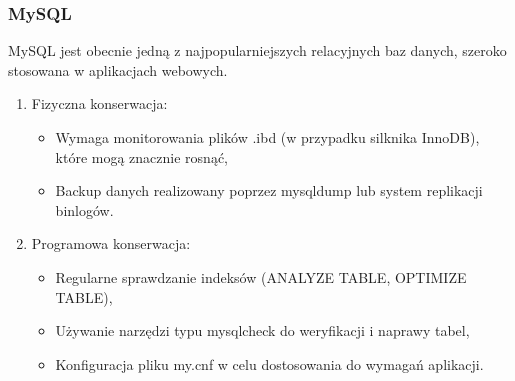 \documentclass[letterpaper,10pt,polish]{sphinxmanual}
\begin{document}
\subsubsection{MySQL}
\label{\detokenize{rozdzial2/Kontrola_i_konserwacja/kontrola_i_konserwacja:mysql}}
\sphinxAtStartPar
MySQL jest obecnie jedną z najpopularniejszych relacyjnych baz danych, szeroko stosowana w aplikacjach webowych.
\begin{enumerate}
%
\item {} 
\sphinxAtStartPar
Fizyczna konserwacja:
\begin{itemize}
\item {} 
\sphinxAtStartPar
Wymaga monitorowania plików .ibd (w przypadku silknika InnoDB), które mogą znacznie rosnąć,

\item {} 
\sphinxAtStartPar
Backup danych realizowany poprzez mysqldump lub system replikacji binlogów.

\end{itemize}

\item {} 
\sphinxAtStartPar
Programowa konserwacja:
\begin{itemize}
\item {} 
\sphinxAtStartPar
Regularne sprawdzanie indeksów (ANALYZE TABLE, OPTIMIZE TABLE),

\item {} 
\sphinxAtStartPar
Używanie narzędzi typu mysqlcheck do weryfikacji i naprawy tabel,

\item {} 
\sphinxAtStartPar
Konfiguracja pliku my.cnf w celu dostosowania do wymagań aplikacji.

\end{itemize}

\end{enumerate}
\end{document}
